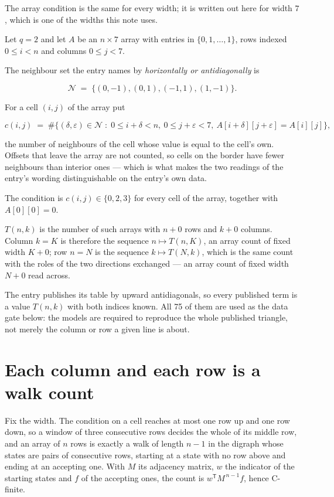 \documentclass[11pt]{article}
\theoremstyle{definition}
\begin{document}
The array condition is the same for every width; it is written out here for width $7$, which is one of the widths this note uses.

Let $q = 2$ and let $A$ be an $n \times 7$ array with entries in $\{0,1,\dots,1\}$, rows indexed $0 \le i < n$ and columns $0 \le j < 7$.

The neighbour set the entry names by {\itshape horizontally or antidiagonally} is

\[\mathcal{N} \;=\; \{(0,-1), (0,1), (-1,1), (1,-1)\}.\]

For a cell $(i,j)$ of the array put

\[c(i,j) \;=\; \#\bigl\{(\delta,\varepsilon)\in\mathcal{N} \;:\; 0\le i+\delta<n,\ 0\le j+\varepsilon<7,\ A[i+\delta][j+\varepsilon] = A[i][j]\bigr\},\]

the number of neighbours of the cell whose value is equal to the cell's own. Offsets that leave the array are not counted, so cells on the border have fewer neighbours than interior ones --- which is what makes the two readings of the entry's wording distinguishable on the entry's own data.

The condition is $c(i,j) \in \{0, 2, 3\}$ for every cell of the array, together with $A[0][0]=0$.

$T(n,k)$ is the number of such arrays with $n + 0$ rows and $k + 0$ columns. Column $k = K$ is therefore the sequence $n \mapsto T(n,K)$, an array count of fixed width $K + 0$; row $n = N$ is the sequence $k \mapsto T(N,k)$, which is the same count with the roles of the two directions exchanged --- an array count of fixed width $N + 0$ read across.

The entry publishes its table by upward antidiagonals, so every published term is a value $T(n,k)$ with both indices known. All 75 of them are used as the data gate below: the models are required to reproduce the whole published triangle, not merely the column or row a given line is about.

\section{Each column and each row is a walk count}

Fix the width. The condition on a cell reaches at most one row up and one row down, so a window of three consecutive rows decides the whole of its middle row, and an array of $n$ rows is exactly a walk of length $n-1$ in the digraph whose states are pairs of consecutive rows, starting at a state with no row above and ending at an accepting one. With $M$ its adjacency matrix, $w$ the indicator of the starting states and $f$ of the accepting ones, the count is $w^{\mathsf T}M^{\,n-1}f$, hence C-finite.
\end{document}
